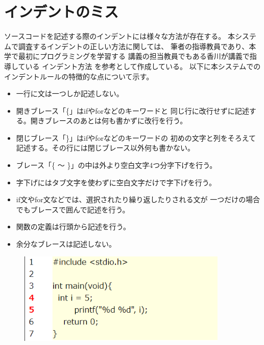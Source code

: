 \documentclass{csspaper}
\begin{document}
      \section{インデントのミス}
      ソースコードを記述する際のインデントには様々な方法が存在する。
      本システムで調査するインデントの正しい方法に関しては、
      筆者の指導教員であり、本学で最初にプログラミングを学習する
      講義の担当教員でもある香川が講義で指導している
      インデント方法 \cite{13}を参考として作成している。
      以下に本システムでのインデントルールの特徴的な点について示す。
      \begin{itemize}
         \item 一行に文は一つしか記述しない。
         
         \item 開きブレース「\{」はifやforなどのキーワードと
         同じ行に改行せずに記述する。開きブレースのあとは何も書かずに改行を行う。

         \item 閉じブレース「\}」はifやforなどのキーワードの
         初めの文字と列をそろえて記述する。その行には閉じブレース以外何も書かない。

         \item ブレース「\{ ～ \}」の中は外より空白文字4つ分字下げを行う。
         
         \item 字下げにはタブ文字を使わずに空白文字だけで字下げを行う。
         
         \item if文やfor文などでは、選択されたり繰り返したりされる文が
         一つだけの場合でもブレースで囲んで記述を行う。

         \item 関数の定義は行頭から記述を行う。
         
         \item 余分なブレースは記述しない。
      \end{itemize}

      \begin{figure}[h]
         \centering
         \includegraphics[width=10cm]{sample6.png}
      \end{figure}
\end{document}

